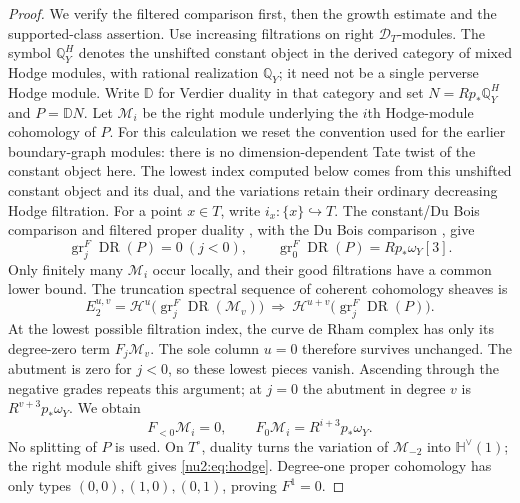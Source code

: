 \begin{proof}
We verify the filtered comparison first, then the growth estimate and
the supported-class assertion.  Use
increasing filtrations on right $\mathcal D_T$-modules.  The symbol
$\mathbb Q_Y^H$ denotes the unshifted constant object in the derived
category of mixed Hodge modules, with rational realization
$\mathbb Q_Y$; it need not be a single perverse Hodge module.
Write $\mathbb D$ for Verdier duality in that category and set
$N=Rp_*\mathbb Q_Y^H$ and $P=\mathbb DN$.  Let $\mathcal M_i$ be
the right module underlying the $i$th Hodge-module cohomology of $P$.
For this calculation we reset the convention used for the earlier
boundary-graph modules: there is no dimension-dependent Tate twist
of the constant object here.  The lowest index computed below comes
from this unshifted constant object and its dual, and the variations
retain their ordinary decreasing Hodge filtration.  For a point $x\in T$, write $i_x:\{x\}\hookrightarrow T$.
The constant/Du Bois comparison and filtered proper duality
\cite{Saito1990,Saito1989,Schnell2014}, with the Du Bois comparison
\cite[preprint, Corollary~0.3, Section~5.3, (5.3.2), and Section~5.4, (5.4.1)]{Saito2000}, give
\[
 \operatorname{gr}_j^F\operatorname{DR}(P)=0\ (j<0),\qquad
 \operatorname{gr}_0^F\operatorname{DR}(P)=Rp_*\omega_Y[3].
\]
Only finitely many $\mathcal M_i$ occur locally, and their good
filtrations have a common lower bound.  The truncation spectral sequence of coherent cohomology sheaves is
\[
 E_2^{u,v}=\mathcal H^u\bigl(\operatorname{gr}_j^F
                  \operatorname{DR}(\mathcal M_v)\bigr)
 \ \Longrightarrow\ \mathcal H^{u+v}
                  \bigl(\operatorname{gr}_j^F\operatorname{DR}(P)\bigr).
\]
At the lowest possible filtration index, the curve de Rham complex
has only its degree-zero term $F_j\mathcal M_v$.  The sole column
$u=0$ therefore survives unchanged.  The abutment is zero for $j<0$,
so these lowest pieces vanish.  Ascending through the negative grades
repeats this argument; at $j=0$ the abutment in degree $v$ is
$R^{v+3}p_*\omega_Y$.  We obtain
\begin{equation}\label{nu2:eq:lowest}
 F_{<0}\mathcal M_i=0,\qquad
 F_0\mathcal M_i=R^{i+3}p_*\omega_Y.
\end{equation}
No splitting of $P$ is used.  On $T^\circ$, duality turns the
variation of $\mathcal M_{-2}$ into $\mathbb H^\vee(1)$; the right
module shift gives \eqref{nu2:eq:hodge}.  Degree-one proper
cohomology has only types $(0,0),(1,0),(0,1)$, proving $F^1=0$.


\end{proof}
